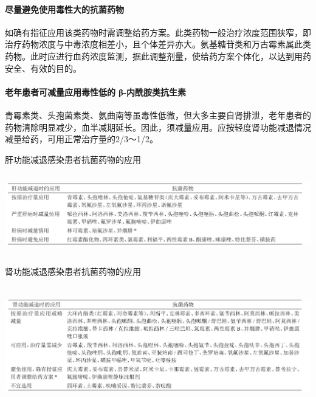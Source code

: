 \paragraph{尽量避免使用毒性大的抗菌药物}

如确有指征应用该类药物时需调整给药方案。此类药物一般治疗浓度范围狭窄，即治疗药物浓度与中毒浓度相差小，且个体差异亦大。氨基糖苷类和万古霉素属此类药物。此时应进行血药浓度监测，据此调整剂量，使给药方案个体化，以达到用药安全、有效的目的。

\paragraph{老年患者可减量应用毒性低的 β-内酰胺类抗生素}

青霉素类、头孢菌素类、氨曲南等虽毒性低微，但大多主要自肾排泄，老年患者的药物清除明显减少，血半减期延长。因此，须减量应用。应按轻度肾功能减退情况减量给药，可用正常治疗量的2/3～1/2。

\begin{table}[htbp]
\centering
\caption{肝功能减退感染患者抗菌药物的应用}
\label{tab154-4}
\includegraphics[width=6.71875in,height=1.375in]{./images/Image00591.jpg}
\end{table}

\begin{table}[htbp]
\centering
\caption{肾功能减退感染患者抗菌药物的应用}
\label{tab154-5}
\includegraphics[width=6.73958in,height=2.04167in]{./images/Image00592.jpg}
\end{table}

